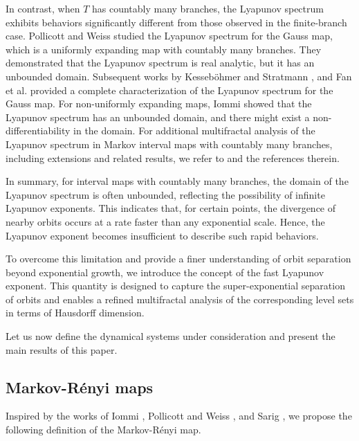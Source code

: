 \documentclass[12pt,reqno]{amsart}
\renewcommand{\=}{\coloneqq}
\theoremstyle{plain}
\begin{document}
In contrast, when $T$ has countably many branches, the Lyapunov spectrum exhibits behaviors significantly different from those observed in the finite-branch case. Pollicott and Weiss \cite{PW} studied the Lyapunov spectrum for the Gauss map, which is a  uniformly expanding map with countably many branches. They demonstrated that the Lyapunov spectrum is real analytic, but it has an unbounded domain. Subsequent works by Kesseb\"{o}hmer and Stratmann \cite{KS07}, and Fan et al. \cite{FLWW09} provided a complete characterization of the Lyapunov spectrum for the Gauss map. For non-uniformly expanding maps, Iommi \cite{Iommi} showed that the Lyapunov spectrum has an unbounded domain, and there might exist a non-differentiability  in the domain. For additional multifractal analysis of the Lyapunov spectrum in Markov interval maps with countably many branches, including extensions and related results, we refer to \cite{FJLR,IJ,JT,KMS,MU,Rush} and the references therein.

In summary, for interval maps with countably many branches, the domain of the Lyapunov spectrum is often unbounded, reflecting the possibility of infinite Lyapunov exponents. This indicates that, for certain points, the divergence of nearby orbits occurs at a rate faster than any exponential scale. Hence, the  Lyapunov exponent becomes insufficient to describe such rapid behaviors.

To overcome this limitation and provide a finer understanding of orbit separation beyond exponential growth, we introduce the concept of the fast Lyapunov exponent. This quantity is designed to capture the super-exponential separation of orbits and enables a refined multifractal analysis of the corresponding level sets in terms of Hausdorff dimension.

Let us now define the dynamical systems under consideration and present the main results of this paper.


\subsection{Markov-R\'{e}nyi maps}\label{subsec_MR}

%

Inspired by the works of Iommi \cite{Iommi}, Pollicott and Weiss \cite{PW}, and Sarig \cite{Sar09}, we propose the following definition of the Markov-R\'{e}nyi map.
\end{document}
